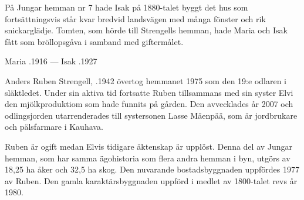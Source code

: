 På Jungar hemman nr 7 hade Isak på 1880-talet byggt det hus som fortsättningsvis står kvar bredvid landsvägen med många fönster och rik snickarglädje. Tomten, som hörde till Strengells hemman, hade Maria och Isak fått som bröllopsgåva i samband med giftermålet.
\begin{jhchildren}
  \item {}
  \item {}
  \item {}
  \item {}
  \item {}
  \item {}
  \item {}
  \item {}
  \item {}
  \item {}
  \item {}
\end{jhchildren}

Maria .1916  ---  Isak .1927






Anders Ruben Strengell, .1942 övertog hemmanet 1975 som den 19:e odlaren i släktledet. Under sin aktiva tid fortsatte Ruben tillsammans med sin syster Elvi den mjölkproduktiom som hade funnits på gården. Den avvecklades år 2007 och odlingsjorden utarrenderades till systersonen Lasse Mäenpää, som är jordbrukare och pälsfarmare i Kauhava.

Ruben är ogift medan Elvis tidigare äktenskap är upplöst. Denna del av Jungar hemman, som har samma ägohistoria som flera andra hemman i byn, utgörs av 18,25 ha åker och 32,5 ha skog. Den nuvarande bostadsbyggnaden uppfördes 1977 av Ruben. Den gamla karaktärsbyggnaden uppförd i medlet av 1800-talet revs år 1980.


